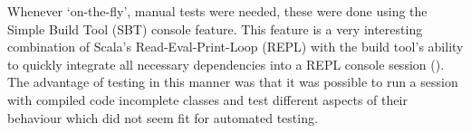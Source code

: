 Whenever `on-the-fly', manual tests were needed, these were done using the
Simple Build Tool (SBT) console feature. This feature is a very interesting
combination of Scala's Read-Eval-Print-Loop (REPL) with the build tool's
ability to quickly integrate all necessary dependencies into a REPL console
session (\cite[][p.~1]{hinojosa2013testing}). The advantage of testing in this
manner was that it was possible to run a session with compiled code incomplete
classes and test different aspects of their behaviour which did not seem fit
for automated testing.

